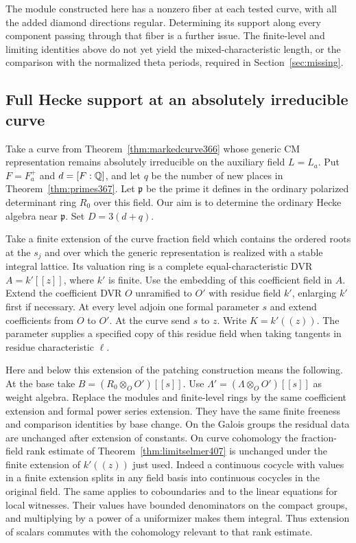 \documentclass[a4paper,11pt]{article}
\theoremstyle{definition}
\theoremstyle{remark}
\numberwithin{equation}{section}
\begin{document}
The module constructed here has a nonzero fiber at each
tested curve, with all the added diamond directions regular.
Determining its support along every component passing through
that fiber is a further issue. The finite-level and limiting
identities above do not yet yield the mixed-characteristic
length, or the comparison with the normalized theta periods,
required in Section~\ref{sec:missing}.


\subsection{Full Hecke support at an absolutely irreducible curve}
\label{sec:irrcurvesupport409}

Take a curve from Theorem~\ref{thm:markedcurve366} whose
generic CM representation remains absolutely irreducible
on the auxiliary field \(L=L_a\). Put \(F=F_a^+\) and
\(d=[F:\mathbb Q]\), and let \(q\) be the number of new places
in Theorem~\ref{thm:primes367}. Let \(\mathfrak p\) be the
prime it defines in the ordinary polarized determinant ring
\(R_0\) over this field. Our aim is to determine the ordinary
Hecke algebra near \(\mathfrak p\). Set \(D=3(d+q)\).

Take a finite extension of the curve fraction field which
contains the ordered roots at the \(s_j\) and over which
the generic representation is realized with a stable
integral lattice. Its valuation ring is a complete
equal-characteristic DVR \(A=k'[[z]]\), where \(k'\) is finite.
Use the embedding of this coefficient field in \(A\).
Extend the coefficient DVR \(O\) unramified to \(O'\) with
residue field \(k'\), enlarging \(k'\) first if necessary.
At every level adjoin one formal parameter \(s\) and extend
coefficients from \(O\) to \(O'\). At the curve send
\(s\) to \(z\). Write \(K=k'((z))\). The parameter supplies a
specified copy of this residue field when taking tangents
in residue characteristic \(\ell\).

Here and below this extension of the patching construction
means the following. At the base take \(B=(R_0\otimes_O O')[[s]]\).
Use \(\Lambda'=(\Lambda\otimes_O O')[[s]]\) as weight algebra.
Replace the modules and finite-level rings by the same
coefficient extension and formal power series extension.
They have the same finite freeness and comparison identities
by base change. On the Galois groups the residual data are
unchanged after extension of constants. On curve cohomology
the fraction-field rank estimate of
Theorem~\ref{thm:limitselmer407} is unchanged under the finite
extension of \(k'((z))\) just used. Indeed a continuous
cocycle with values in a finite extension splits in any field
basis into continuous cocycles in the original field.
The same applies to coboundaries and to the linear equations
for local witnesses. Their values have bounded denominators
on the compact groups, and multiplying by a power of a
uniformizer makes them integral. Thus extension of scalars
commutes with the cohomology relevant to that rank estimate.
\end{document}

